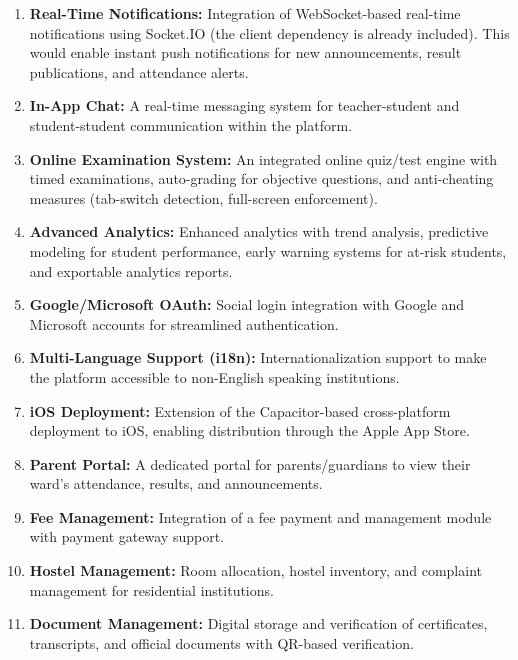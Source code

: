 \begin{enumerate}[label=\arabic*., leftmargin=2em]
    \item \textbf{Real-Time Notifications:} Integration of WebSocket-based real-time notifications using Socket.IO (the client dependency is already included). This would enable instant push notifications for new announcements, result publications, and attendance alerts.
    
    \item \textbf{In-App Chat:} A real-time messaging system for teacher-student and student-student communication within the platform.
    
    \item \textbf{Online Examination System:} An integrated online quiz/test engine with timed examinations, auto-grading for objective questions, and anti-cheating measures (tab-switch detection, full-screen enforcement).
    
    \item \textbf{Advanced Analytics:} Enhanced analytics with trend analysis, predictive modeling for student performance, early warning systems for at-risk students, and exportable analytics reports.
    
    \item \textbf{Google/Microsoft OAuth:} Social login integration with Google and Microsoft accounts for streamlined authentication.
    
    \item \textbf{Multi-Language Support (i18n):} Internationalization support to make the platform accessible to non-English speaking institutions.
    
    \item \textbf{iOS Deployment:} Extension of the Capacitor-based cross-platform deployment to iOS, enabling distribution through the Apple App Store.
    
    \item \textbf{Parent Portal:} A dedicated portal for parents/guardians to view their ward's attendance, results, and announcements.
    
    \item \textbf{Fee Management:} Integration of a fee payment and management module with payment gateway support.
    
    \item \textbf{Hostel Management:} Room allocation, hostel inventory, and complaint management for residential institutions.
    
    \item \textbf{Document Management:} Digital storage and verification of certificates, transcripts, and official documents with QR-based verification.
    

\end{enumerate}
